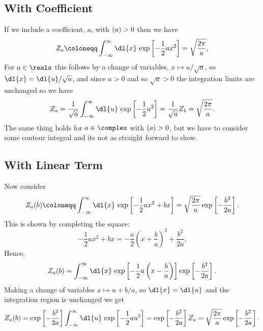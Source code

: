 \documentclass[fleqn]{NotesClass}
\let\Re\relax
\DeclareMathOperator{\Re}{Re}
\begin{document}
    \subsection{With Coefficient}
    If we include a coefficient, \(a\), with \(\Re(a) > 0\) then we have
    \begin{equation}
        Z_a \coloneqq \int_{-\infty}^{\infty} \dl{x} \, \exp\left[ -\frac{1}{2}ax^2 \right] = \sqrt{\frac{2\pi}{a}},
    \end{equation}
    For \(a \in \reals\) this follows by a change of variables, \(x \mapsto u/\sqrt{a}\), so \(\dl{x} = \dl{u}/\sqrt{a}\), and since \(a > 0\) and so \(\sqrt{a} > 0\) the integration limits are unchanged so we have
    \begin{equation}
        Z_a = \frac{1}{\sqrt{a}} \int_{-\infty}^{\infty} \dl{u} \, \exp\left[ -\frac{1}{2}u^2 \right] = \frac{1}{\sqrt{a}} Z_1 = \sqrt{\frac{2\pi}{a}}.
    \end{equation}
    The same thing holds for \(a \in \complex\) with \(\Re(a) > 0\), but we have to consider some contour integral and its not as straight forward to show.
    
    \subsection{With Linear Term}
    Now consider
    \begin{equation}\label{eqn:gaussian 1d with linear term}
        Z_a(b) \coloneqq \int_{-\infty}^{\infty} \dl{x} \, \exp\left[ -\frac{1}{2}ax^2 + bx \right] = \sqrt{\frac{2\pi}{a}} \exp\left[ -\frac{b^2}{2a} \right].
    \end{equation}
    This is shown by completing the square:
    \begin{equation}
        -\frac{1}{2}ax^2 + bx = -\frac{a}{2}\left( x + \frac{b}{a} \right)^2 + \frac{b^2}{2a}.
    \end{equation}
    Hence,
    \begin{equation}
        Z_a(b) = \int_{-\infty}^{\infty} \dl{x} \, \exp\left[ -\frac{1}{2}a\left( x - \frac{b}{a} \right) \right] \exp\left[ -\frac{b^2}{2a} \right].
    \end{equation}
    Making a change of variables \(x \mapsto u + b/a\), so \(\dl{x} = \dl{u}\) and the integration region is unchanged we get
    \begin{equation*}
        Z_a(b) = \exp\left[ -\frac{b^2}{2a} \right] \int_{-\infty}^{\infty} \dl{u} \, \exp\left[ -\frac{1}{2}au^2 \right] = \exp\left[ -\frac{b^2}{2a} \right] Z_a = \sqrt{\frac{2\pi}{a}} \exp\left[ -\frac{b^2}{2a} \right].
    \end{equation*}
    
\end{document}
